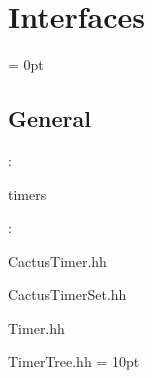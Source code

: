 
\section{Interfaces} 


\parskip = 0pt

\vspace{3mm} \subsection*{General}

: 

timers
\vspace{2mm}

\vspace{5mm}

: 



CactusTimer.hh

CactusTimerSet.hh

Timer.hh

TimerTree.hh
\vspace{2mm}\parskip = 10pt 
